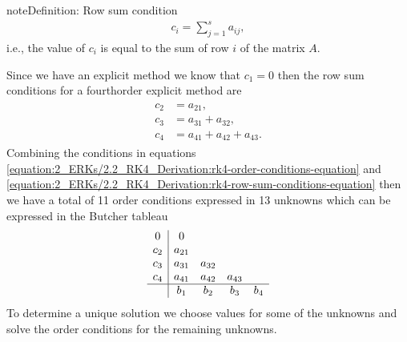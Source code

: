 \documentclass[letterpaper,10pt,english]{jupyterBook}
\begin{document}
\begin{sphinxadmonition}{note}{Definition: Row sum condition}
\label{equation:2_ERKs/2.2_RK4_Derivation:089ff539-b337-4289-85e8-0c62ff339609}\begin{align}
    c_i =\sum_{j=1}^{s} a_{ij},
\end{align}
\sphinxAtStartPar
i.e., the value of \(c_i\) is equal to the sum of row \(i\) of the matrix \(A\).
\end{sphinxadmonition}

\sphinxAtStartPar
Since we have an explicit method we know that \(c_1 = 0\) then the row sum conditions for a fourth\sphinxhyphen{}order explicit method are
\begin{equation}\label{equation:2_ERKs/2.2_RK4_Derivation:rk4-row-sum-conditions-equation}
\begin{split}\begin{align*}
    c_2 &=a_{21} ,\\
    c_3 &=a_{31} + a_{32} ,\\
    c_4 &=a_{41} + a_{42} + a_{43} .
\end{align*}\end{split}
\end{equation}
\sphinxAtStartPar
Combining the conditions in equations \eqref{equation:2_ERKs/2.2_RK4_Derivation:rk4-order-conditions-equation} and \eqref{equation:2_ERKs/2.2_RK4_Derivation:rk4-row-sum-conditions-equation} then we have a total of 11 order conditions expressed in 13 unknowns  which can be expressed in the Butcher tableau
\begin{align*}
    \begin{array}{c|cccc}
        0 & 0 \\
        c_2 & a_{21} \\
        c_3 & a_{31} & a_{32} \\
        c_4 & a_{41} & a_{42} & a_{43} \\ \hline
        & b_1 & b_2 & b_3 & b_4
    \end{array}
\end{align*}
\sphinxAtStartPar
To determine a unique solution we choose values for some of the unknowns and solve the order conditions for the remaining unknowns.
\end{document}
